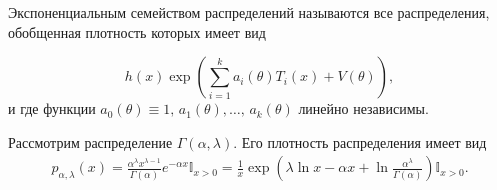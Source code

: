 \begin{definition}
Экспоненциальным семейством распределений называются все распределения, обобщенная плотность которых имеет вид


\begin{equation*}
h( x)\exp\left(\sum _{i=1}^{k} a_{i}( \theta ) T_{i}( x) +V( \theta )\right) ,
\end{equation*}
и где функции $\displaystyle a_{0}( \theta ) \equiv 1,\, a_{1}( \theta ) ,\dotsc ,\, a_{k}( \theta )$ линейно независимы.
\end{definition}
\begin{example}
Рассмотрим распределение $\displaystyle \Gamma ( \alpha ,\lambda )$. Его плотность распределения имеет вид
\begin{gather}
    p_{\alpha ,\lambda }( x) =\frac{\alpha ^{\lambda } x^{\lambda -1}}{\Gamma ( \alpha )} e^{-\alpha x}\mathbb{I}_{x >0} =\frac{1}{x}\exp\left( \lambda \ln x-\alpha x+\ln\frac{\alpha ^{\lambda }}{\Gamma ( \alpha )}\right)\mathbb{I}_{x >0}.
\end{gather}
\end{example}